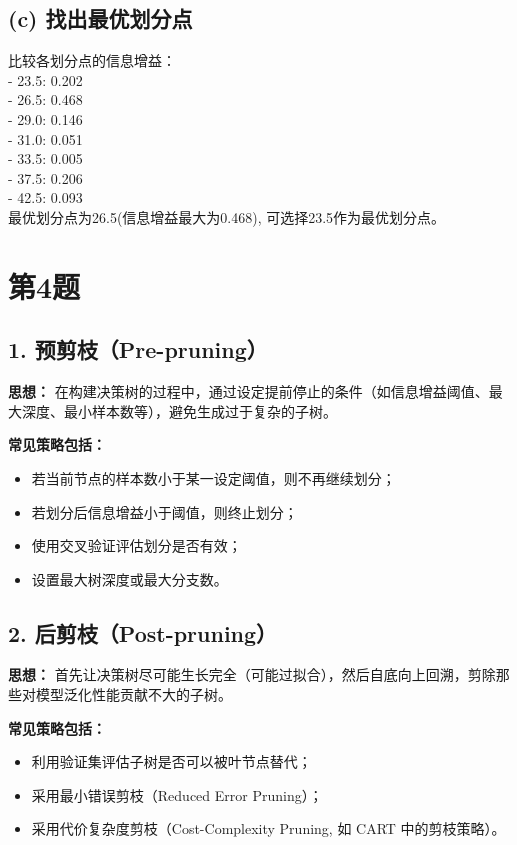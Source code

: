 \documentclass{article}
\begin{document}
\subsection*{(c) 找出最优划分点}
比较各划分点的信息增益：\\
- 23.5: 0.202  \\
- 26.5: 0.468  \\
- 29.0: 0.146  \\
- 31.0: 0.051  \\
- 33.5: 0.005  \\
- 37.5: 0.206  \\
- 42.5: 0.093  \\

最优划分点为26.5(信息增益最大为0.468), 可选择23.5作为最优划分点。

\section*{第4题}

\subsection*{1. 预剪枝（Pre-pruning）}

\textbf{思想：} 在构建决策树的过程中，通过设定提前停止的条件（如信息增益阈值、最大深度、最小样本数等），避免生成过于复杂的子树。

\textbf{常见策略包括：}
\begin{itemize}
  \item 若当前节点的样本数小于某一设定阈值，则不再继续划分；
  \item 若划分后信息增益小于阈值，则终止划分；
  \item 使用交叉验证评估划分是否有效；
  \item 设置最大树深度或最大分支数。
\end{itemize}

\subsection*{2. 后剪枝（Post-pruning）}

\textbf{思想：} 首先让决策树尽可能生长完全（可能过拟合），然后自底向上回溯，剪除那些对模型泛化性能贡献不大的子树。

\textbf{常见策略包括：}
\begin{itemize}
  \item 利用验证集评估子树是否可以被叶节点替代；
  \item 采用最小错误剪枝（Reduced Error Pruning）；
  \item 采用代价复杂度剪枝（Cost-Complexity Pruning, 如 CART 中的剪枝策略）。
\end{itemize}
\end{document}

